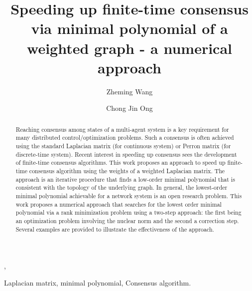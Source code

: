 \documentclass[onecolumn,reviewcopy]{autart}
\begin{document}
\begin{frontmatter}


\title{Speeding up finite-time consensus via minimal polynomial of a weighted graph - a numerical approach}

\author[AddA]{Zheming Wang} ,
\author[AddA]{Chong Jin Ong}

\address[AddA]{Department of Mechanical Engineering, National University of Singapore, 117576, Singapore}


\begin{keyword}
Laplacian matrix, minimal polynomial, Consensus algorithm.
\end{keyword}

\begin{abstract}
Reaching consensus among states of a multi-agent system is a key requirement for many distributed control/optimization problems.
Such a consensus is often achieved using the standard Laplacian matrix (for continuous system) or Perron matrix
(for discrete-time system). Recent interest in speeding up consensus sees the development of finite-time consensus algorithms.
This work proposes an approach to speed up finite-time consensus algorithm using the weights of a weighted Laplacian matrix.
The approach is an iterative procedure that finds a low-order minimal polynomial that is consistent with the topology of the underlying graph. In general, the lowest-order minimal polynomial achievable for a network system is an open research problem. This work proposes a numerical approach that searches for the lowest order minimal polynomial via a rank minimization problem using a two-step approach: the first being an optimization problem involving the nuclear norm and the second a correction step. Several examples are provided to illustrate the effectiveness of the approach.
\end{abstract}

\end{frontmatter}








\end{document}
